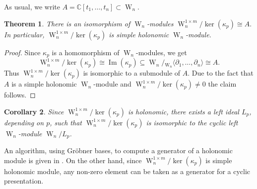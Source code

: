 \documentclass[a4paper,10pt]{article}
\newtheorem{Th}{Theorem}[section]
\newtheorem{Corollary}[Th]{Corollary}
\theoremstyle{nonumberplain}
\newtheorem{proof}{Proof}
\newcommand{\C}{\mathbb{C}}
\DeclareMathOperator{\W}{W}
\DeclareMathOperator{\Bild}{Im}
\begin{document}
As usual, we write $A=\C[t_1,\ldots,t_n]\subset \W_n$.

\begin{Th}\label{WeylCAlgebra}
There is an isomorphism of $\W_n$-modules
$ \W_n^{1\times m} / \ker(\kappa_p) \cong A.$
In particular, $\W_n^{1\times m} / \ker(\kappa_p)$ is simple holonomic $\W_n$-module.
\end{Th}
\begin{proof}
 Since $\kappa_p$ is a homomorphism of $\W_n$-modules, we get
$$ \W_n^{1\times m} / \ker(\kappa_p) \cong \Bild(\kappa_p) \subseteq \W_n / {}_{\W_n} \langle \partial_1, 
\dots, \partial_n \rangle \cong A. $$ 
Thus $ \W_n^{1\times m} / \ker(\kappa_p) $ is isomorphic to a submodule of $A$. 
Due to the fact that $A$ is a simple holonomic $\W_n$-module and $ \W_n^{1\times m} / \ker(\kappa_p) \neq 0$ 
the claim follows.
\end{proof}


\begin{Corollary}\label{cyclic}
 Since $\W_n^{1\times m} / \ker(\kappa_p)$ is holonomic, there exists a left 
ideal $L_p$, depending on $p$, such that $\W_n^{1\times m} / \ker(\kappa_p) $ 
is isomorphic to the cyclic left $\W_n$-module $\W_n / L_p $. 
\end{Corollary}

An algorithm, using Gr\"obner bases, to compute a generator of a holonomic module
is given in \cite{L04}. On the other hand, since $\W_n^{1\times m} / \ker(\kappa_p)$ is simple holonomic module, any non-zero element can be taken as a generator for a cyclic presentation.



\end{document}
